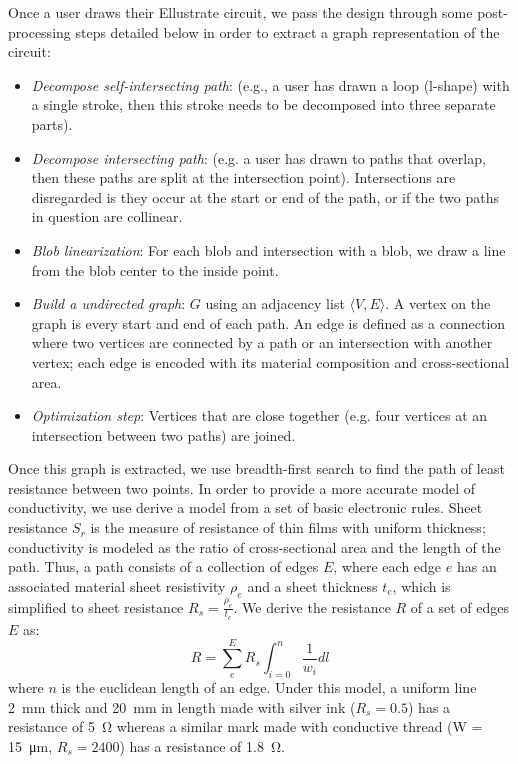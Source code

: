 \documentclass{sigchi}
\begin{document}
    Once a user draws their Ellustrate circuit, we pass the design through some post-processing steps detailed below in order to extract a graph representation of the circuit:
    \begin{itemize}
        \item \textit{Decompose self-intersecting path}:  (e.g., a user has drawn a loop (l-shape) with a single stroke, then this stroke needs to be decomposed into three separate parts).
        \item \textit{Decompose intersecting path}:  (e.g. a user has drawn to paths that overlap, then these paths are split at the intersection point). Intersections are disregarded is they occur at the start or end of the path, or if the two paths in question are collinear.
        \item \textit{Blob linearization}: For each blob and intersection with a blob, we draw a line from the blob center to the inside point.
        \item \textit{Build a undirected graph}: $G$ using an adjacency list $\langle V, E \rangle$. A vertex on the graph is every start and end of each path. An edge is defined as a connection where two vertices are connected by a path or an intersection with another vertex; each edge is encoded with its material composition and cross-sectional area.
        \item \textit{Optimization step}: Vertices that are close together (e.g. four vertices at an intersection between two paths) are joined.
    \end{itemize}
    Once this graph is extracted, we use breadth-first search to find the path of least resistance  between two points. In order to provide a more accurate model of conductivity, we use derive a model from a set of basic electronic rules. Sheet resistance $S_r$ is the measure of resistance of thin films with uniform thickness; conductivity is modeled as the ratio of cross-sectional area and the length of the path. Thus, a path consists of a collection of edges $E$, where each edge $e$ has an associated material sheet resistivity $\rho_e$ and a sheet thickness $t_e$, which is simplified to sheet resistance $R_s = \frac{\rho_e}{t_e}$. We derive the resistance $R$ of a set of edges $E$ as:
    \begin{equation}
        R =  \sum^{E}_e R_s \int_{i=0}^{n}  \frac{1}{w_i} dl
    \label{eq:resistance}
    \end{equation}
    where $n$ is the euclidean length of an edge. Under this model, a uniform line \SI{2}{\milli\metre} thick and \SI{20}{\milli\metre} in length made with silver ink ($R_s = 0.5$) has a resistance of \SI{5}{\ohm} whereas a similar mark made with conductive thread (W = \SI{15}{\micro\metre}, $R_s = 2400$) has a resistance of \SI{1.8}{\ohm}.
\end{document}
